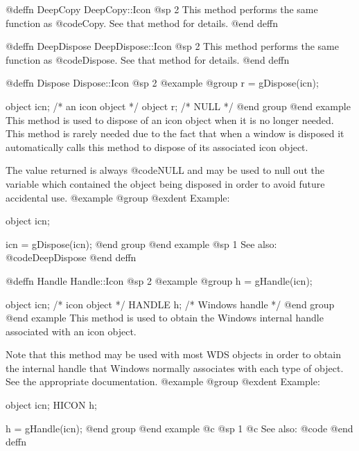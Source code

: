 @deffn {DeepCopy} DeepCopy::Icon
@sp 2
This method performs the same function as @code{Copy}.  See that
method for details.
@end deffn










@deffn {DeepDispose} DeepDispose::Icon
@sp 2
This method performs the same function as @code{Dispose}.  See that
method for details.
@end deffn







@deffn {Dispose} Dispose::Icon
@sp 2
@example
@group
r = gDispose(icn);

object  icn;   /*  an icon object  */
object  r;     /*  NULL            */
@end group
@end example
This method is used to dispose of an icon object when it is no longer
needed.  This method is rarely needed due to the fact that when a window
is disposed it automatically calls this method to dispose of its
associated icon object.

The value returned is always @code{NULL} and may be used to null out
the variable which contained the object being disposed in order to
avoid future accidental use.
@example
@group
@exdent Example:

object  icn;

icn = gDispose(icn);
@end group
@end example
@sp 1
See also:  @code{DeepDispose}
@end deffn










@deffn {Handle} Handle::Icon
@sp 2
@example
@group
h = gHandle(icn);

object  icn;    /*  icon object     */
HANDLE  h;      /*  Windows handle  */
@end group
@end example
This method is used to obtain the Windows internal handle associated with
an icon object.  

Note that this method may be used with most WDS objects in order to obtain
the internal handle that Windows normally associates with each type of object.
See the appropriate documentation.
@example
@group
@exdent Example:

object  icn;
HICON   h;

h = gHandle(icn);
@end group
@end example
@c @sp 1
@c See also:  @code{}
@end deffn









